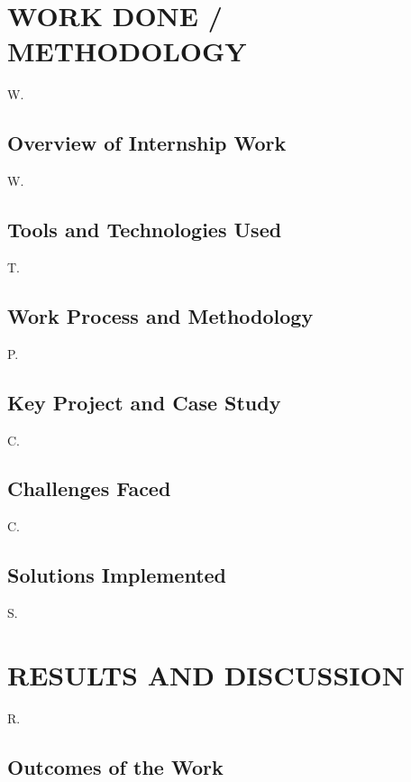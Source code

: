 \documentclass[12pt,a4paper]{report}
\begin{document}
\chapter{WORK DONE / METHODOLOGY}


W.


\section{Overview of Internship Work}

W.


\section{Tools and Technologies Used}

T.




\section{Work Process and Methodology}

P.


\section{Key Project and Case Study}

C.




\section{Challenges Faced}

C.


\section{Solutions Implemented}

S.


\chapter{RESULTS AND DISCUSSION}


R.




\section{Outcomes of the Work}
\end{document}
